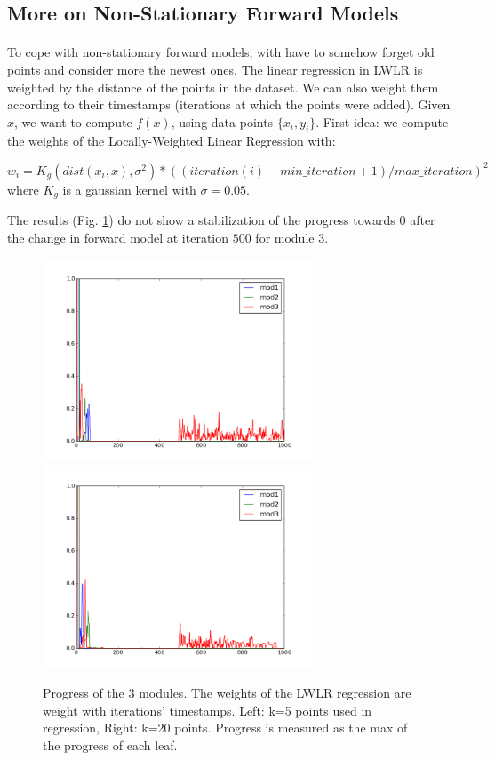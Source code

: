 \documentclass[12pt]{article}
\begin{document}
	
	\subsection{More on Non-Stationary Forward Models}
	\label{NSLWLR}
	
		\paragraph{}
		To cope with non-stationary forward models, with have to somehow forget old points and consider more the newest ones.
		The linear regression in LWLR is weighted by the distance of the points in the dataset. We can also weight them according to their timestamps (iterations at which the points were added).
		Given $x$, we want to compute $f(x)$, using data points $\{x_i, y_i\}$.
		First idea: we compute the weights of the Locally-Weighted Linear Regression with:
		
		$$ w_i = K_g(dist(x_i, x), \sigma^2) * ((iteration(i) - min\_iteration +1)/max\_iteration)^2$$
		where $K_g$ is a gaussian kernel with $\sigma = 0.05$.
		
		The results (Fig. \ref{NS1}) do not show a stabilization of the progress towards $0$ after the change in forward model at iteration $500$ for module $3$.
		
		\begin{figure}[H]
			\centering
			\includegraphics[width=8cm]{./include/NSLWLR-k=05.png}
			\includegraphics[width=8cm]{./include/NSLWLR-k=20.png}
			\caption{Progress of the 3 modules. The weights of the LWLR regression are weight with iterations' timestamps. Left: k=5 points used in regression, Right: k=20 points. Progress is measured as the max of the progress of each leaf.}
			\label{NS1}
		\end{figure}
		
\end{document}

